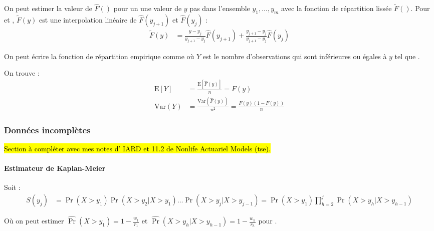 \documentclass[french]{article}
\begin{document}
\begin{multicols*}{2}
On peut estimer la valeur de $\hat{F}()$ pour un une valeur de $y$ pas dans l'ensemble $y_{1}, \dots, y_{m}$ avec la fonction de répartition lissée $\tilde{F}()$. Pour  et , $\tilde{F}(y)$ est une interpolation linéaire de $\hat{F}(y_{j + 1})$ et $\hat{F}(y_{j})$ :
\begin{align*}
	\tilde{F}(y)
	&=	\frac{y	-	y_{j	}}{y_{j + 1}	-	y_{j}}\hat{F}(y_{j + 1})  + 
		\frac{y_{j + 1}	-	y_{j	}}{y_{j + 1}	-	y_{j}}\hat{F}(y_{j})
\end{align*}

\begin{definitionNOHFILLprop}
On peut écrire la fonction de répartition empirique comme  où $Y$ est le nombre d'observations qui sont inférieures ou égales à $y$ tel que .

\bigskip

On trouve :
\begin{align*}
	\text{E}[Y]	
	&=	\frac{\text{E}[\hat{F}(y)]}{n}
	=	F(y)		\\
	\text{Var}(Y)
	&=	\frac{\text{Var}(\hat{F}(y))}{n^{2}}
	=	\frac{F(y)(1 - F(y))}{n}
\end{align*}
\end{definitionNOHFILLprop}



\columnbreak
\subsubsection{Données incomplètes}
\hl{Section à compléter avec mes notes d’ IARD et 11.2 de Nonlife Actuariel Models (tse).}

\bigskip

\paragraph{Estimateur de Kaplan-Meier}
Soit : 
\begin{align*}
	S(y_{j})
	&=	\Pr(X > y_{1})	\Pr(X > y_{2} | X > y_{1}) \hdots \Pr(X > y_{j} | X > y_{j - 1})
	=	\Pr(X > y_{1}) \prod_{h = 2}^{j} \Pr(X > y_{h} | X > y_{h - 1})
\end{align*}

Où on peut estimer $\widehat{\Pr}(X > y_{1})	=	1	-	\frac{w_{1}}{r_{1}}$ et $\widehat{\Pr}(X > y_{h} | X > y_{h - 1})	=	1	-	\frac{w_{h}}{r_{h}}$ pour .


\end{multicols*}
\end{document}
